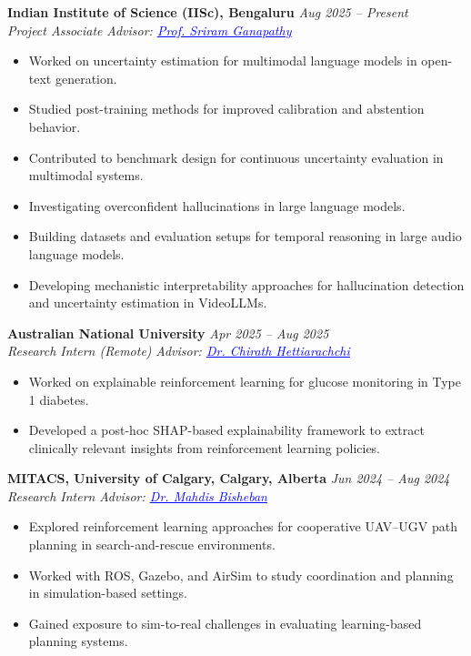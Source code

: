 \documentclass[a4paper,10pt]{article}
\newcommand{\link}[2]{\href{#1}{\textcolor{blue}{\underline{#2}}}}
\begin{document}
\textbf{Indian Institute of Science (IISc), Bengaluru} \hfill \textit{Aug 2025 -- Present}\\
\textit{Project Associate} \hfill \textit{Advisor: \link{https://eecs.iisc.ac.in/people/sriram-ganapathy/}{Prof. Sriram Ganapathy}} \vspace{-0.4em}
\begin{itemize}
    \item Worked on uncertainty estimation for multimodal language models in open-text generation.
    \item Studied post-training methods for improved calibration and abstention behavior.
    \item Contributed to benchmark design for continuous uncertainty evaluation in multimodal systems.
    \item Investigating overconfident hallucinations in large language models.
    \item Building datasets and evaluation setups for temporal reasoning in large audio language models.
    \item Developing mechanistic interpretability approaches for hallucination detection and uncertainty estimation in VideoLLMs.
\end{itemize}

\textbf{Australian National University} \hfill \textit{Apr 2025 -- Aug 2025}\\
\textit{Research Intern (Remote)} \hfill \textit{Advisor: \link{https://comp.anu.edu.au/people/chirath-hettiarachchi/}{Dr. Chirath Hettiarachchi}} \vspace{-0.4em}
\begin{itemize}
    \item Worked on explainable reinforcement learning for glucose monitoring in Type 1 diabetes.
    \item Developed a post-hoc SHAP-based explainability framework to extract clinically relevant insights from reinforcement learning policies.
\end{itemize}

\textbf{MITACS, University of Calgary, Calgary, Alberta} \hfill \textit{Jun 2024 -- Aug 2024}\\
\textit{Research Intern} \hfill \textit{Advisor: \link{https://profiles.ucalgary.ca/mahdis-bisheban}{Dr. Mahdis Bisheban}} \vspace{-0.4em}
\begin{itemize}
    \item Explored reinforcement learning approaches for cooperative UAV--UGV path planning in search-and-rescue environments.
    \item Worked with ROS, Gazebo, and AirSim to study coordination and planning in simulation-based settings.
    \item Gained exposure to sim-to-real challenges in evaluating learning-based planning systems.
\end{itemize}
\end{document}
